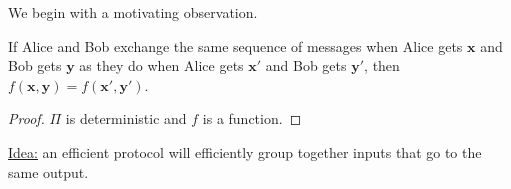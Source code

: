We begin with a motivating observation.
\pause
\begin{lemma}
If Alice and Bob exchange the same sequence of messages when Alice gets $\textbf{x}$ and Bob gets $\textbf{y}$ as they do when Alice gets $\textbf{x}'$ and Bob gets $\textbf{y}'$, then $f(\textbf{x}, \textbf{y}) = f(\textbf{x}', \textbf{y}')$.
\end{lemma}
\pause
\begin{proof}
$\Pi$ is deterministic and $f$ is a function.
\end{proof}
\pause
\underline{Idea:} an efficient protocol will efficiently group together inputs that go to the same output.